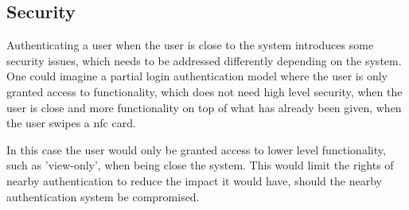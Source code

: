 \subsection{Security}

Authenticating a user when the user is close to the system introduces some security issues, which needs to be addressed differently depending on the system. One could imagine a partial login authentication model where the user is only granted access to functionality, which does not need high level security, when the user is close and more functionality on top of what has already been given, when the user swipes a nfc card. 

In this case the user would only be granted access to lower level functionality, such as 'view-only', when being close the system. This would limit the rights of nearby authentication to reduce the impact it would have, should the nearby authentication system be compromised. 

